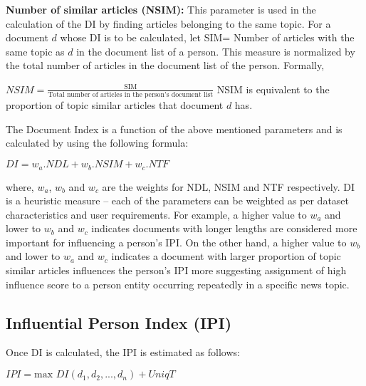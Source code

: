 \noindent \textbf{Number of similar articles (NSIM): }
This parameter is used in the calculation of the DI by finding articles belonging to the same topic. 
For a document $d$ whose DI is to be calculated, let  SIM= Number of articles with the same topic as $d$ in the document list of a person.
This measure is normalized by the total number of articles in the document list of the person. Formally,

$NSIM= \frac{\text{SIM}} {\text{Total number of articles in the person's document list}}$
NSIM is equivalent to the proportion of topic similar articles that document $d$ has.

The Document Index is a function of the above mentioned parameters and is calculated by using the following formula:
\begin{center}

			$DI = w_a . NDL + w_b . NSIM + w_c . NTF $
\end{center}
where, $w_a$, $ w_b$ and $w_c$ are the weights for NDL, NSIM and NTF respectively.
DI is a heuristic measure -- each of the parameters can be weighted as per dataset characteristics and user requirements. For example, a higher value to $w_a$ and lower to $w_b$ and $w_c$ indicates documents with longer lengths are considered more important for influencing a person's IPI. On the other hand, a higher value to $w_b$ and lower to $w_a$ and $w_c$ indicates a document with larger proportion of topic similar articles influences the person's IPI more suggesting assignment of high influence score to a person entity occurring repeatedly in a specific news topic.  

\subsection{Influential Person Index (IPI)}

Once DI is calculated, the IPI is estimated as follows:
		
\begin{center}
$IPI= \text{max } DI(d_1, d_2, ...,d_n)+ UniqT$
\end{center}


